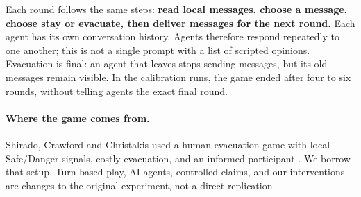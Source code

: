 \documentclass[11pt]{article}
\begin{document}
Each round follows the same steps: \textbf{read local messages, choose a message, choose stay or evacuate, then deliver messages for the next round.} Each agent has its own conversation history. Agents therefore respond repeatedly to one another; this is not a single prompt with a list of scripted opinions. Evacuation is final: an agent that leaves stops sending messages, but its old messages remain visible. In the calibration runs, the game ended after four to six rounds, without telling agents the exact final round.

\paragraph{Where the game comes from.}
Shirado, Crawford and Christakis used a human evacuation game with local Safe/Danger signals, costly evacuation, and an informed participant \cite{danger}. We borrow that setup. Turn-based play, AI agents, controlled claims, and our interventions are changes to the original experiment, not a direct replication.
\end{document}
